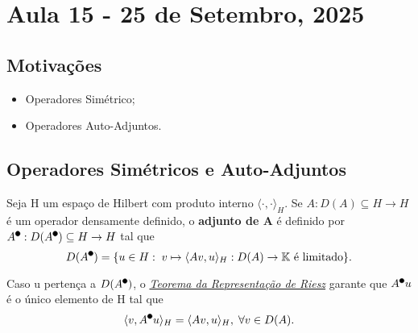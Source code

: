 \documentclass[../functional_analysis.tex]{subfiles}
\begin{document}
\section{Aula 15 - 25 de Setembro, 2025}
\subsection{Motivações}
\begin{itemize}
	\item Operadores Simétrico;
	\item Operadores Auto-Adjuntos.
\end{itemize}
\subsection{Operadores Simétricos e Auto-Adjuntos}
\begin{def*}
	Seja H um espaço de Hilbert com produto interno \(\langle \cdot , \cdot  \rangle_{H}\). Se \(A:D(A)\subseteq H\rightarrow H\) é um operador densamente definido, o \textbf{adjunto de A} é definido por
	\(A^{\tikz[baseline=-0.5ex]\draw[black, fill=black, radius=2pt](0, 0)circle;}:D(A^{\tikz[baseline=-0.5ex]\draw[black, fill=black, radius=2pt](0, 0)circle;})\subseteq H\rightarrow H\)
	tal que
	\[
		D(A^{\tikz[baseline=-0.5ex]\draw[black, fill=black, radius=2pt](0, 0)circle;}) = \{u\in H:\; v\mapsto \langle Av, u \rangle_{H}:D(A)\rightarrow \mathbb{K} \text{ é limitado}\}.
	\]
\end{def*}
Caso u pertença a \(D(A^{\tikz[baseline=-0.5ex]\draw[black, fill=black, radius=2pt](0, 0)circle;})\), o \hyperlink{riesz_representation}{\textit{Teorema da Representação de Riesz}} garante que \(A^{\tikz[baseline=-0.5ex]\draw[black, fill=black, radius=2pt](0, 0)circle;}u\) é o
único elemento de H tal que
\[
	\langle v, A^{\tikz[baseline=-0.5ex]\draw[black, fill=black, radius=2pt](0, 0)circle;}u \rangle_{H} = \langle Av, u \rangle_{H},\; \forall v\in D(A).
\]
\end{document}
